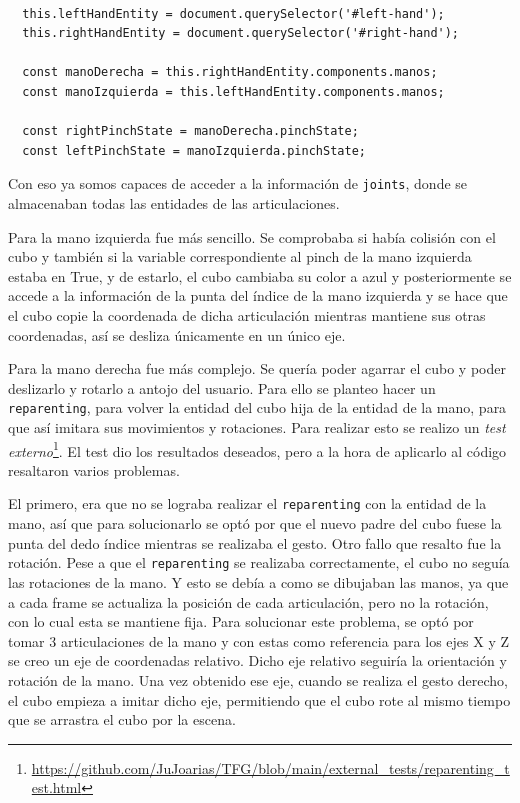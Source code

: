 \documentclass[a4paper, 12pt]{book}
\begin{document}
\begin{lstlisting}[caption=Acceso información componente manos, captionpos=b, label=lst:info_manos]
  
  this.leftHandEntity = document.querySelector('#left-hand');
  this.rightHandEntity = document.querySelector('#right-hand');

  const manoDerecha = this.rightHandEntity.components.manos;
  const manoIzquierda = this.leftHandEntity.components.manos;

  const rightPinchState = manoDerecha.pinchState;
  const leftPinchState = manoIzquierda.pinchState;
\end{lstlisting}

Con eso ya somos capaces de acceder a la información de \texttt{joints}, donde se almacenaban todas las entidades de las articulaciones.

Para la mano izquierda fue más sencillo. Se comprobaba si había colisión con el cubo y también si la variable correspondiente al pinch de la mano izquierda estaba en True, y de estarlo, el cubo cambiaba su color a azul y posteriormente se accede a la información 
de la punta del índice de la mano izquierda y se hace que el cubo copie la coordenada de dicha articulación mientras mantiene sus otras coordenadas, así se desliza únicamente en un único eje.

Para la mano derecha fue más complejo. Se quería poder agarrar el cubo y poder deslizarlo y rotarlo a antojo del usuario. Para ello se planteo hacer un \texttt{reparenting}, para volver la entidad del cubo hija de la entidad de la mano, para que así imitara sus movimientos y rotaciones. Para realizar esto se realizo un \textit{test externo}\footnote{\url{https://github.com/JuJoarias/TFG/blob/main/external_tests/reparenting_test.html}}.
El test dio los resultados deseados, pero a la hora de aplicarlo al código resaltaron varios problemas. 

El primero, era que no se lograba realizar el \texttt{reparenting} con la entidad de la mano, así que para solucionarlo se optó por que el nuevo padre del cubo fuese la punta del dedo índice mientras se realizaba el gesto.
Otro fallo que resalto fue la rotación. Pese a que el \texttt{reparenting} se realizaba correctamente, el cubo no seguía las rotaciones de la mano. Y esto se debía a como se dibujaban las manos, ya que a cada frame se actualiza la posición de cada articulación, pero no la rotación, con lo cual esta se mantiene fija. Para solucionar este problema, se optó por tomar 3 articulaciones de la mano y con estas 
como referencia para los ejes X y Z se creo un eje de coordenadas relativo. Dicho eje relativo seguiría la orientación y rotación de la mano. Una vez obtenido ese eje, cuando se realiza el gesto derecho, el cubo empieza a imitar dicho eje, permitiendo que el cubo rote al mismo tiempo que se arrastra el cubo por la escena. 
\end{document}
